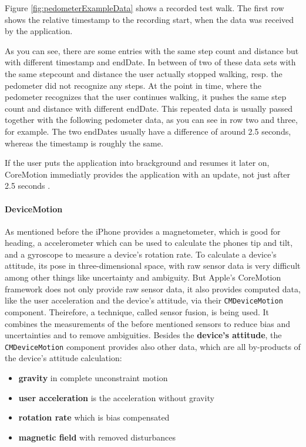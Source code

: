 Figure \ref{fig:pedometerExampleData} shows a recorded test walk.
The first row shows the relative timestamp to the recording start, when the data was received by the application.

As you can see, there are some entries with the same step count and distance but with different timestamp and endDate.
In between of two of these data sets with the same stepcount and distance the user actually stopped walking, resp. the pedometer did not recognize any steps.
At the point in time, where the pedometer recognizes that the user continues walking, it pushes the same step count and distance with different endDate.
This repeated data is usually passed together with the following pedometer data, as you can see in row two and three, for example.
The two endDates usually have a difference of around 2.5 seconds, whereas the timestamp is roughly the same.

If the user puts the application into brackground and resumes it later on, CoreMotion immediatly provides the application with an update, not just after 2.5 seconds \cite{wwdc_2014}.


\paragraph{DeviceMotion}

As mentioned before the iPhone provides a magnetometer, which is good for heading, a accelerometer which can be used to calculate the phones tip and tilt, and a gyroscope to measure a device's rotation rate.
To calculate a device's attitude, its pose in three-dimensional space, with raw sensor data is very difficult among other things like uncertainty and ambiguity.
But Apple's CoreMotion framework does not only provide raw sensor data, it also provides computed data, like the user acceleration and the device's attitude, via their \texttt{CMDeviceMotion} component.
Theirefore, a technique, called sensor fusion, is being used.
It combines the measurements of the before mentioned sensors to reduce bias and uncertainties and to remove ambiguities.
Besides the \textbf{device's attitude}, the \texttt{CMDeviceMotion} component provides also other data, which are all by-products of the device's attitude calculation:
\begin{itemize}
  \item \textbf{gravity} in complete unconstraint motion
  \item \textbf{user acceleration} is the acceleration without gravity
  \item \textbf{rotation rate} which is bias compensated
  \item \textbf{magnetic field} with removed disturbances
\end{itemize}

